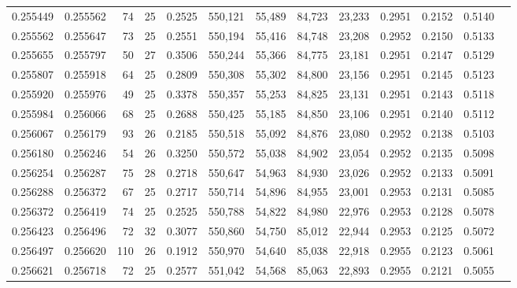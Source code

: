 \begin{tabular}{rrrrrrrrrrrrr}
0.255449 & 0.255562 &  74 &  25 &                                     0.2525 & 550,121 &  55,489 &  84,723 &  23,233 & 0.2951 & 0.2152 & 0.5140 \\
0.255562 & 0.255647 &  73 &  25 &                                     0.2551 & 550,194 &  55,416 &  84,748 &  23,208 & 0.2952 & 0.2150 & 0.5133 \\
0.255655 & 0.255797 &  50 &  27 &                                     0.3506 & 550,244 &  55,366 &  84,775 &  23,181 & 0.2951 & 0.2147 & 0.5129 \\
0.255807 & 0.255918 &  64 &  25 &                                     0.2809 & 550,308 &  55,302 &  84,800 &  23,156 & 0.2951 & 0.2145 & 0.5123 \\
0.255920 & 0.255976 &  49 &  25 &                                     0.3378 & 550,357 &  55,253 &  84,825 &  23,131 & 0.2951 & 0.2143 & 0.5118 \\
0.255984 & 0.256066 &  68 &  25 &                                     0.2688 & 550,425 &  55,185 &  84,850 &  23,106 & 0.2951 & 0.2140 & 0.5112 \\
0.256067 & 0.256179 &  93 &  26 &                                     0.2185 & 550,518 &  55,092 &  84,876 &  23,080 & 0.2952 & 0.2138 & 0.5103 \\
0.256180 & 0.256246 &  54 &  26 &                                     0.3250 & 550,572 &  55,038 &  84,902 &  23,054 & 0.2952 & 0.2135 & 0.5098 \\
0.256254 & 0.256287 &  75 &  28 &                                     0.2718 & 550,647 &  54,963 &  84,930 &  23,026 & 0.2952 & 0.2133 & 0.5091 \\
0.256288 & 0.256372 &  67 &  25 &                                     0.2717 & 550,714 &  54,896 &  84,955 &  23,001 & 0.2953 & 0.2131 & 0.5085 \\
0.256372 & 0.256419 &  74 &  25 &                                     0.2525 & 550,788 &  54,822 &  84,980 &  22,976 & 0.2953 & 0.2128 & 0.5078 \\
0.256423 & 0.256496 &  72 &  32 &                                     0.3077 & 550,860 &  54,750 &  85,012 &  22,944 & 0.2953 & 0.2125 & 0.5072 \\
0.256497 & 0.256620 & 110 &  26 &                                     0.1912 & 550,970 &  54,640 &  85,038 &  22,918 & 0.2955 & 0.2123 & 0.5061 \\
0.256621 & 0.256718 &  72 &  25 &                                     0.2577 & 551,042 &  54,568 &  85,063 &  22,893 & 0.2955 & 0.2121 & 0.5055 \\

\end{tabular}
